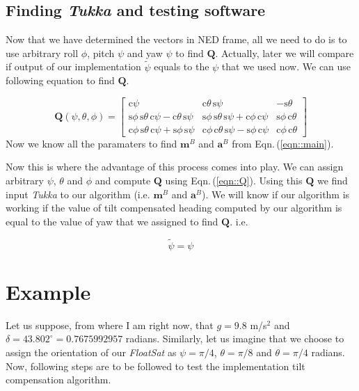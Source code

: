 \documentclass[12pt]{article}
\begin{document}
\subsection{Finding \textit{Tukka} and testing software}
Now that we have determined the vectors in NED frame, all we need to do is to use arbitrary roll $\phi$, pitch $\psi$ and yaw $\psi$ to find $\bm{Q}$. Actually, later we will compare if output of our implementation $\tilde{\psi}$ equals to the $\psi$ that we used now. We can use following equation to find $\bm{Q}$.

\begin{equation}
    \bm{Q}(\psi, \theta, \phi) = 
    \begin{bmatrix}
        \text{c}\psi & \text{c}\theta\,\text{s}\psi & -\text{s}\theta \\
        \text{s}\phi\,\text{s}\theta\,\text{c}\psi - \text{c}\theta\,\text{s}\psi & \text{s}\phi\,\text{s}\theta\,\text{s}\psi + \text{c}\phi\,\text{c}\psi & \text{s}\phi\,\text{c}\theta \\
        \text{c}\phi\,\text{s}\theta\,\text{c}\psi + \text{s}\phi\,\text{s}\psi & \text{c}\phi\,\text{c}\theta\,\text{s}\psi -\text{s}\phi\,\text{c}\psi & \text{c}\phi\,\text{c}\theta
    \end{bmatrix}
    \label{eqn::Q}
\end{equation}
Now we know all the paramaters to find $\bm{m}^{B}$ and $\bm{a}^{B}$ from Eqn.\,(\ref{eqn::main}). \medskip

Now this is where the advantage of this process comes into play. We can assign arbitrary $\psi$, $\theta$ and $\phi$ and compute $\bm{Q}$ using Eqn.\,(\ref{eqn::Q}). Using this $\bm{Q}$ we find input \textit{Tukka} to our algorithm (i.e. $\bm{m}^{B}$ and $\bm{a}^{B}$). We will know if our algorithm is working if the value of tilt compensated heading computed by our algorithm is equal to the value of yaw that we assigned to find $\bm{Q}$. i.e.

\begin{equation}
    \tilde{\psi} = \psi
\end{equation}

\section{Example}
Let us suppose, from where I am right now, that $g = 9.8$ m/s$^{2}$ and $\delta = 43.802^{\circ} = 0.7675992957$ radians. Similarly, let us imagine that we choose to assign the orientation of our \textit{FloatSat} as $\psi = \pi/4$, $\theta = \pi/8$ and $\theta = \pi/4$ radians. Now, following steps are to be followed to test the implementation tilt compensation algorithm.
\end{document}

